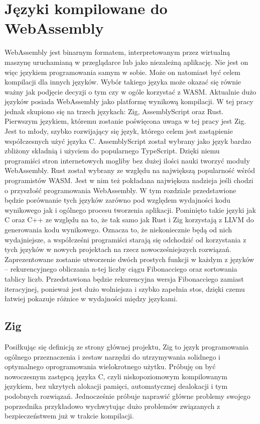 \documentclass[language=polish,type=master]{aghmodern}
\begin{document}
\chapter{Języki kompilowane do WebAssembly}
WebAssembly jest binarnym formatem, interpretowanym przez wirtualną maszynę uruchamianą w przeglądarce lub jako niezależną aplikację.
Nie jest on więc językiem programowania samym w sobie.
Może on natomiast być celem kompilacji dla innych języków.
Wybór takiego języka może okazać się równie ważny jak podjęcie decyzji o tym czy w ogóle korzystać z WASM.
Aktualnie dużo języków posiada WebAssembly jako platformę wynikową kompilacji.
W tej pracy jednak skupiono się na trzech językach: Zig, AssemblyScript oraz Rust.
Pierwszym językiem, któremu zostanie poświęcona uwaga w tej pracy jest Zig.
Jest to młody, szybko rozwijający się język, którego celem jest zastąpienie współczesnych użyć języka C.
AssemblyScript został wybrany jako język bardzo zbliżony składnią i użyciem do popularnego TypeScript.
Dzięki niemu programiści stron internetowych mogliby bez dużej ilości nauki tworzyć moduły WebAssembly.
Rust został wybrany ze względu na największą popularność wśród programistów WASM.
Jest w nim też pokładana największa nadzieja jeśli chodzi o przyszłość programowania WebAssembly.
W tym rozdziale przedstawione będzie porównanie tych języków zarówno pod względem wydajności kodu wynikowego jak i ogólnego procesu tworzenia aplikacji.
Pominięto takie języki jak C oraz C++ ze względu na to, że tak samo jak Rust i Zig korzystają z LLVM\footnotemark{} do generowania kodu wynikowego.
Oznacza to, że niekoniecznie będą od nich wydajniejsze, a współcześni programiści starają się odchodzić od korzystania z tych języków w nowych projektach na rzecz nowocześniejszych rozwiązań.
Zaprezentowane zostanie utworzenie dwóch prostych funkcji w każdym z języków -- rekurencyjnego obliczania n-tej liczby ciągu Fibonacciego oraz sortowania tablicy liczb.
Przedstawiona będzie rekurencyjna wersja Fibonacciego zamiast iteracyjnej, ponieważ jest dużo wolniejsza i szybko zapełnia stos, dzięki czemu łatwiej pokazuje różnice w wydajności między językami.

\section{Zig}
Posiłkując się definicją ze strony głównej projektu\footnotemark{}, Zig to język programowania ogólnego przeznaczenia i zestaw narzędzi do utrzymywania solidnego i optymalnego oprogramowania wielokrotnego użytku.
Próbuję on być nowoczesnym zastępcą języka C, czyli niskopoziomowym kompilowanym językiem, bez ukrytych alokacji pamięci, automatycznej dealokacji i tym podobnych rozwiązań.
Jednocześnie próbuje naprawić główne problemy swojego poprzednika przykładowo wychwytując dużo problemów związanych z bezpieczeństwem już w trakcie kompilacji.
\end{document}
